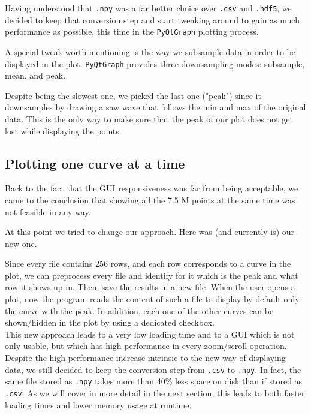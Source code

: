 \documentclass[11pt,a4paper]{article}
\begin{document}
Having understood that \texttt{.npy} was a far better choice over \texttt{.csv} and \texttt{.hdf5}, we decided to keep that conversion step and start tweaking around to gain as much performance as possible, this time in the \texttt{PyQtGraph} plotting process.

A special tweak worth mentioning is the way we subsample data in order to be displayed in the plot.
\texttt{PyQtGraph} provides three downsampling modes: subsample, mean, and peak.

Despite being the slowest one, we picked the last one ("peak") since it downsamples by drawing a saw wave that follows the min and max of the original data. This is the only way to make sure that the peak of our plot does not get lost while displaying the points.\\

\subsection{Plotting one curve at a time}

Back to the fact that the GUI responsiveness was far from being acceptable, we came to the conclusion that showing all the 7.5 M points at the same time was not feasible in any way.

At this point we tried to change our approach. Here was (and currently is) our new one.

Since every file contains 256 rows, and each row corresponds to a curve in the plot, we can preprocess every file and identify for it which is the peak and what row it shows up in. Then, save the results in a new file.
When the user opens a plot, now the program reads the content of such a file to display by default only the curve with the peak. In addition, each one of the other curves can be shown/hidden in the plot by using a dedicated checkbox.\\

This new approach leads to a very low loading time and to a GUI which is not only usable, but which has high performance in every zoom/scroll operation.\\

Despite the high performance increase intrinsic to the new way of displaying data, we still decided to keep the conversion step from \texttt{.csv} to \texttt{.npy}.
In fact, the same file stored as \texttt{.npy} takes more than 40\% less space on disk than if stored as \texttt{.csv}.
As we will cover in more detail in the next section, this leads to both faster loading times and lower memory usage at runtime.
\end{document}
